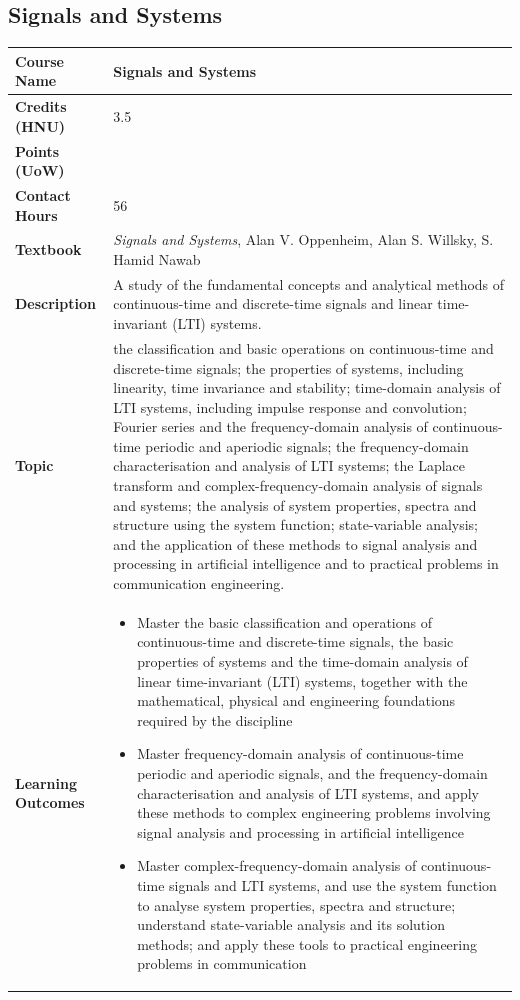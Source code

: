 \documentclass{article}
\begin{document}
\subsection{Signals and Systems}
\renewcommand{\arraystretch}{1.5} %
\begin{longtable}{|p{3cm}|p{10cm}|}
\hline
\textbf{Course Name} & Signals and Systems \\
\hline
\textbf{Credits (HNU)} & 3.5 \\
\hline
\textbf{Points (UoW)} & \\
\hline
\textbf{Contact Hours} & 56 \\
\hline
\textbf{Textbook} & \emph{Signals and Systems}, Alan V. Oppenheim, Alan S. Willsky, S. Hamid Nawab \\
\hline
\textbf{Description} & A study of the fundamental concepts and analytical methods of continuous-time and discrete-time signals and linear time-invariant (LTI) systems. \\
\hline
\textbf{Topic} & the classification and basic operations on continuous-time and discrete-time signals; the properties of systems, including linearity, time invariance and stability; time-domain analysis of LTI systems, including impulse response and convolution; Fourier series and the frequency-domain analysis of continuous-time periodic and aperiodic signals; the frequency-domain characterisation and analysis of LTI systems; the Laplace transform and complex-frequency-domain analysis of signals and systems; the analysis of system properties, spectra and structure using the system function; state-variable analysis; and the application of these methods to signal analysis and processing in artificial intelligence and to practical problems in communication engineering. \\
\hline
\textbf{Learning Outcomes} & 
    \begin{itemize}
        \item Master the basic classification and operations of continuous-time and discrete-time signals, the basic properties of systems
            and the time-domain analysis of linear time-invariant (LTI) systems, together with the mathematical, physical and engineering
            foundations required by the discipline
        \item Master frequency-domain analysis of continuous-time periodic and aperiodic signals, and the frequency-domain characterisation
     and analysis of LTI systems, and apply these methods to complex engineering problems involving signal analysis and processing
     in artificial intelligence
        \item Master complex-frequency-domain analysis of continuous-time signals and LTI systems, and use the system function to analyse
     system properties, spectra and structure; understand state-variable analysis and its solution methods; and apply these tools
     to practical engineering problems in communication
    \end{itemize} \\
\hline
\end{longtable}
\end{document}
